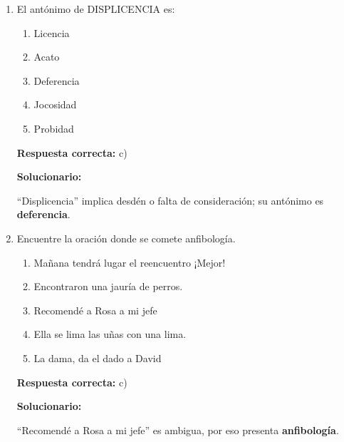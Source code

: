 \begin{enumerate}[resume]
	\vspace{2mm}
	\textbf{Solucionario:}
	
	La secuencia marcada es \textbf{A pesar - es decir}, que enlaza concesión y explicación según el ejercicio.
	
	\vspace{6mm}
	
	\item El antónimo de DISPLICENCIA es:
	\begin{enumerate}[label=\alph*)]
		\item Licencia
		\item Acato
		\item Deferencia
		\item Jocosidad
		\item Probidad
	\end{enumerate}
	\textbf{Respuesta correcta:} c)
	
	\vspace{2mm}
	\textbf{Solucionario:}
	
	“Displicencia” implica desdén o falta de consideración; su antónimo es \textbf{deferencia}.
	
	\vspace{6mm}
	
	\item Encuentre la oración donde se comete anfibología.
	\begin{enumerate}[label=\alph*)]
		\item Mañana tendrá lugar el reencuentro ¡Mejor!
		\item Encontraron una jauría de perros.
		\item Recomendé a Rosa a mi jefe
		\item Ella se lima las uñas con una lima.
		\item La dama, da el dado a David
	\end{enumerate}
	\textbf{Respuesta correcta:} c)
	
	\vspace{2mm}
	\textbf{Solucionario:}
	
	“Recomendé a Rosa a mi jefe” es ambigua, por eso presenta \textbf{anfibología}.
	
	\vspace{6mm}
	

\end{enumerate}
